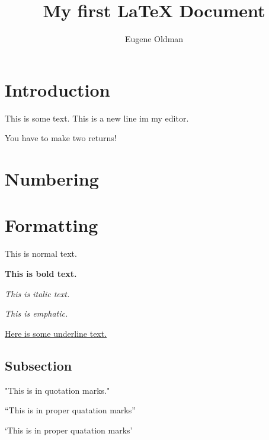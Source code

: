 \documentclass{article}
\author{Eugene Oldman}
\title{My first {\LaTeX} Document}
\begin{document}
\maketitle

\section{Introduction}

This is some text.
This is a new line im my editor.

You have to make two returns!

\section{Numbering}

\section{Formatting}

This is normal text.

\textbf{This is bold text.}

\textit{This is italic text.}

\emph{This is emphatic.}

\underline{Here is some underline text.}

\subsection{Subsection}

"This is in quotation marks."

``This is in proper quatation marks''

`This is in proper quatation marks'
\end{document}

